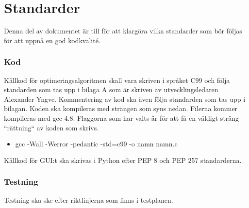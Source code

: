 \section{Standarder}
Denna del av dokumentet är till för att klargöra vilka standarder som bör följas för att uppnå en god kodkvalité.

\subsubsection{Kod}
Källkod för optimeringsalgoritmen skall vara skriven i språket C99 och följa standarden som tas upp i bilaga A som är skriven av utvecklingsledaren Alexander Yngve. Kommentering av kod ska även följa standarden som tas upp i bilagan. 
\newline
\newline
Koden ska kompileras med strängen som syns nedan. Filerna kommer kompileras med gcc 4.8. Flaggorna som har valts är för att få en väldigt sträng ``rättning`` av koden som skrivs. 

\begin{itemize}
\item gcc -Wall -Werror -pedantic -std=c99 -o namn namn.c
\end{itemize}
\noindent Källkod för GUI:t ska skrivas i Python efter PEP 8 och PEP 257 standarderna. 

\subsubsection{Testning}
Testning ska ske efter riktlinjerna som finns i testplanen.
